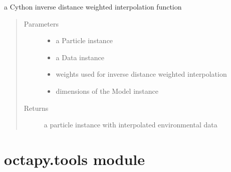 \documentclass[letterpaper,10pt,english]{sphinxmanual}
\begin{document}
\begin{fulllineitems}
\label{\detokenize{octapy:octapy.interp_idw.interp_idw}}
\sphinxAtStartPar
a Cython inverse distance weighted interpolation function
\begin{quote}\begin{description}
\item[{Parameters}] \leavevmode\begin{itemize}
\item {} 
\sphinxAtStartPar
{} \textendash{} a Particle instance

\item {} 
\sphinxAtStartPar
{} \textendash{} a Data instance

\item {} 
\sphinxAtStartPar
{} \textendash{} weights used for inverse distance weighted interpolation

\item {} 
\sphinxAtStartPar
{} \textendash{} dimensions of the Model instance

\end{itemize}

\item[{Returns}] \leavevmode
\sphinxAtStartPar
a particle instance with interpolated environmental data

\end{description}\end{quote}

\end{fulllineitems}



\chapter{octapy.tools module}
\label{\detokenize{octapy:module-octapy.tools}}\label{\detokenize{octapy:octapy-tools-module}}
\end{document}
